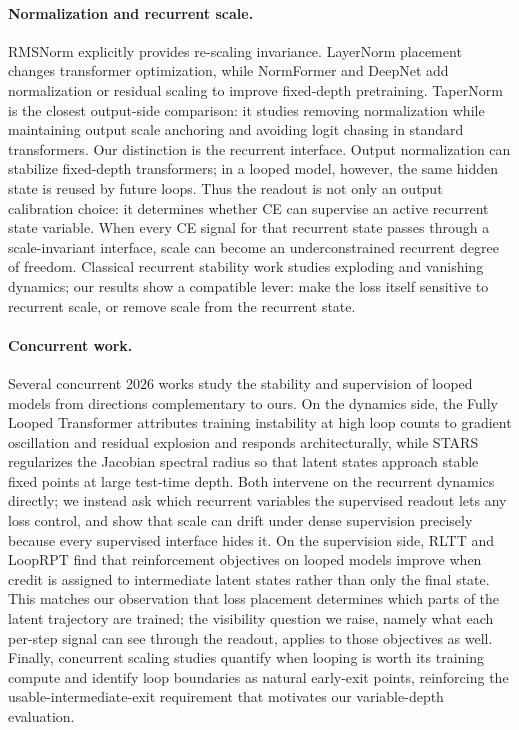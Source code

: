 \paragraph{Normalization and recurrent scale.}
RMSNorm \citep{zhang2019rmsnorm} explicitly provides re-scaling invariance.
LayerNorm placement \citep{xiong2020layernorm} changes transformer optimization, while NormFormer \citep{shleifer2021normformer} and DeepNet \citep{wang2022deepnet} add normalization or residual scaling to improve fixed-depth pretraining.
TaperNorm \citep{kanavalau2026tapernorm} is the closest output-side comparison: it studies removing normalization while maintaining output scale anchoring and avoiding logit chasing in standard transformers.
Our distinction is the recurrent interface.
Output normalization can stabilize fixed-depth transformers; in a looped model, however, the same hidden state is reused by future loops.
Thus the readout is not only an output calibration choice: it determines whether CE can supervise an active recurrent state variable.
When every CE signal for that recurrent state passes through a scale-invariant interface, scale can become an underconstrained recurrent degree of freedom.
Classical recurrent stability work \citep{pascanu2013difficulty} studies exploding and vanishing dynamics; our results show a compatible lever: make the loss itself sensitive to recurrent scale, or remove scale from the recurrent state.

\paragraph{Concurrent work.}
Several concurrent 2026 works study the stability and supervision of looped models from directions complementary to ours.
On the dynamics side, the Fully Looped Transformer \citep{fu2026fullylooped} attributes training instability at high loop counts to gradient oscillation and residual explosion and responds architecturally, while STARS \citep{yang2026stars} regularizes the Jacobian spectral radius so that latent states approach stable fixed points at large test-time depth.
Both intervene on the recurrent dynamics directly; we instead ask which recurrent variables the supervised readout lets any loss control, and show that scale can drift under dense supervision precisely because every supervised interface hides it.
On the supervision side, RLTT \citep{williams2026rltt} and LoopRPT \citep{tang2026looprpt} find that reinforcement objectives on looped models improve when credit is assigned to intermediate latent states rather than only the final state.
This matches our observation that loss placement determines which parts of the latent trajectory are trained; the visibility question we raise, namely what each per-step signal can see through the readout, applies to those objectives as well.
Finally, concurrent scaling studies \citep{schwethelm2026isodepth,lee2026sparse} quantify when looping is worth its training compute and identify loop boundaries as natural early-exit points, reinforcing the usable-intermediate-exit requirement that motivates our variable-depth evaluation.
